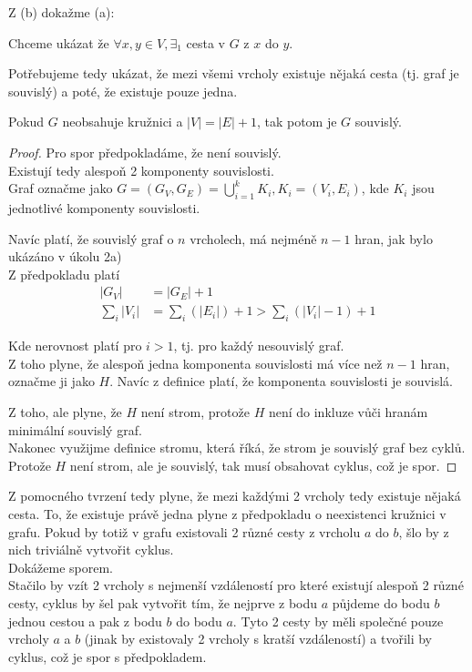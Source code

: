 \documentclass[../main.tex]{subfiles}
\begin{document}
Z (b) dokažme (a):

Chceme ukázat že $\forall x,y \in V, \exists_1$ cesta v $G$ z $x$ do $y$. 

Potřebujeme tedy ukázat, že mezi všemi vrcholy existuje nějaká cesta (tj. graf je souvislý) a poté, že existuje pouze jedna.


\begin{lemma*}
    Pokud $G$ neobsahuje kružnici a $|V| = |E| + 1$, tak potom je $G$ souvislý.
\end{lemma*}
\begin{proof}
Pro spor předpokladáme, že není souvislý. \\
Existují tedy alespoň 2 komponenty souvislosti.\\
Graf označme jako $G = (G_V, G_E) = \bigcup_{i=1}^k K_i, K_i = (V_i, E_i)$, kde $K_i$ jsou jednotlivé komponenty souvislosti.

Navíc platí, že souvislý graf o $n$ vrcholech, má nejméně $n - 1$ hran, jak bylo ukázáno v úkolu 2a) \\
Z předpokladu platí \begin{align*}
    |G_V| &= |G_E| + 1\\
    \sum_{i} |V_i| &= \sum_i (|E_i|) + 1 > \sum_i (|V_i| - 1) + 1  
\end{align*}

Kde nerovnost platí pro $i>1$, tj. pro každý nesouvislý graf.\\
Z toho plyne, že alespoň jedna komponenta souvislosti má více než $n-1$ hran, označme ji jako $H$.
Navíc z definice platí, že komponenta souvislosti je souvislá.

Z toho, ale plyne, že $H$ není strom, protože $H$ není do inkluze vůči hranám minimální souvislý graf.\\
Nakonec využijme definice stromu, která říká, že strom je souvislý graf bez cyklů.
Protože $H$ není strom, ale je souvislý, tak musí obsahovat cyklus, což je spor.
\end{proof}


Z pomocného tvrzení tedy plyne, že mezi každými 2 vrcholy tedy existuje nějaká cesta. To, že existuje právě jedna plyne z předpokladu o neexistenci kružnici v grafu.
Pokud by totiž v grafu existovali 2 různé cesty z vrcholu $a$ do $b$, šlo by z nich triviálně vytvořit cyklus. \\Dokážeme sporem.\\
Stačilo by vzít 2 vrcholy s nejmenší vzdáleností pro které existují alespoň 2 různé cesty, cyklus by šel pak vytvořit tím, že nejprve z bodu $a$ půjdeme do bodu $b$ jednou cestou a pak z bodu $b$ do bodu $a$.
Tyto 2 cesty by měli společné pouze vrcholy $a$ a $b$ (jinak by existovaly 2 vrcholy s kratší vzdáleností) a tvořili by cyklus, což je spor s předpokladem.
\end{document}
